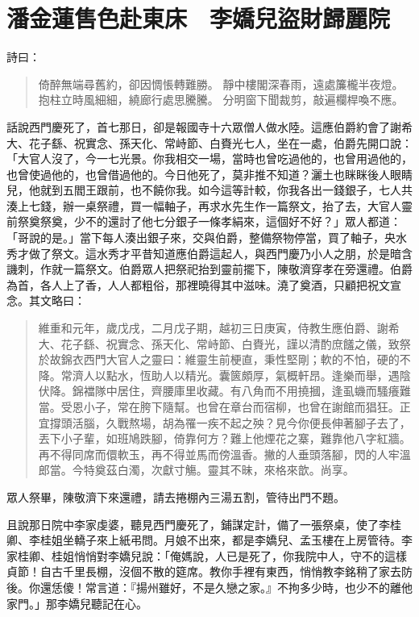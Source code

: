 
\chapter{潘金蓮售色赴東床　李嬌兒盜財歸麗院}

詩曰：
\begin{quote}
倚醉無端尋舊約，卻因惆悵轉難勝。
靜中樓閣深春雨，遠處簾櫳半夜燈。
抱柱立時風細細，繞廊行處思騰騰。
分明窗下聞裁剪，敲遍欄桿喚不應。
\end{quote}

話說西門慶死了，首七那日，卻是報國寺十六眾僧人做水陸。這應伯爵約會了謝希大、花子繇、祝實念、孫天化、常峙節、白賚光七人，坐在一處，伯爵先開口說：「大官人沒了，今一七光景。你我相交一場，當時也曾吃過他的，也曾用過他的，也曾使過他的，也曾借過他的。今日他死了，莫非推不知道？灑土也眯眯後人眼睛兒，他就到五閻王跟前，也不饒你我。如今這等計較，你我各出一錢銀子，七人共湊上七錢，辦一桌祭禮，買一幅軸子，再求水先生作一篇祭文，抬了去，大官人靈前祭奠祭奠，少不的還討了他七分銀子一條孝絹來，這個好不好？」眾人都道：「哥說的是。」當下每人湊出銀子來，交與伯爵，整備祭物停當，買了軸子，央水秀才做了祭文。這水秀才平昔知道應伯爵這起人，與西門慶乃小人之朋，於是暗含譏刺，作就一篇祭文。伯爵眾人把祭祀抬到靈前擺下，陳敬濟穿孝在旁還禮。伯爵為首，各人上了香，人人都粗俗，那裡曉得其中滋味。澆了奠酒，只顧把祝文宣念。其文略曰：
\begin{quote}
維重和元年，歲戊戌，二月戊子期，越初三日庚寅，侍教生應伯爵、謝希大、花子繇、祝實念、孫天化、常峙節、白賚光，謹以清酌庶饈之儀，致祭於故錦衣西門大官人之靈曰：維靈生前梗直，秉性堅剛；軟的不怕，硬的不降。常濟人以點水，恆助人以精光。囊篋頗厚，氣概軒昂。逢樂而舉，遇陰伏降。錦襠隊中居住，齊腰庫里收藏。有八角而不用撓摑，逢虱蟣而騷癢難當。受恩小子，常在胯下隨幫。也曾在章台而宿柳，也曾在謝館而猖狂。正宜撐頭活腦，久戰熬場，胡為罹一疾不起之殃？見今你便長伸著腳子去了，丟下小子輩，如班鳩跌腳，倚靠何方？難上他煙花之寨，難靠他八字紅牆。再不得同席而儇軟玉，再不得並馬而傍溫香。撇的人垂頭落腳，閃的人牢溫郎當。今特奠茲白濁，次獻寸觴。靈其不昧，來格來歆。尚享。
\end{quote}

眾人祭畢，陳敬濟下來還禮，請去捲棚內三湯五割，管待出門不題。

且說那日院中李家虔婆，聽見西門慶死了，鋪謀定計，備了一張祭桌，使了李桂卿、李桂姐坐轎子來上紙弔問。月娘不出來，都是李嬌兒、孟玉樓在上房管待。李家桂卿、桂姐悄悄對李嬌兒說：「俺媽說，人已是死了，你我院中人，守不的這樣貞節！自古千里長棚，沒個不散的筵席。教你手裡有東西，悄悄教李銘稍了家去防後。你還恁傻！常言道：『揚州雖好，不是久戀之家。』不拘多少時，也少不的離他家門。」那李嬌兒聽記在心。

